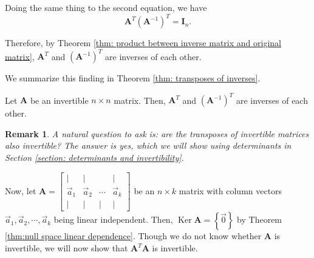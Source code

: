 \documentclass[]{book}
\DeclareMathOperator{\kernel}{Ker}
\newcommand{\inv}[1]{\ensuremath{{#1}^{-1}}}
\newcommand{\invm}[1]{\ensuremath{\inv{\mat{#1}}}}
\newcommand{\mat}[1]{\ensuremath{\mathbf{#1}}}
\newcommand{\idmat}[1][n]{\ensuremath{\mat{I}_#1}}
\newtheorem*{remark}{Remark}
\begin{document}
Doing the same thing to the second equation, we have
\[\mat{A}^T\left(\invm{A}\right)^T = \idmat.\]

Therefore, by Theorem \ref{thm: product between inverse matrix and original matrix}, $\mat{A}^T$ and $\left(\invm{A}\right)^T$ are inverses of each other. 

We summarize this finding in Theorem \ref{thm: transposes of inverses}.

\begin{theorem}
    \label{thm: transposes of inverses}
    Let $\mat{A}$ be an invertible $n \times n$ matrix. Then, $\mat{A}^T$ and $\left(\invm{A}\right)^T$ are inverses of each other.
\end{theorem}

\begin{remark}
    A natural question to ask is: are the transposes of invertible matrices also invertible? The answer is yes, which we will show using determinants in Section \ref{section: determinants and invertibility}.
\end{remark}

Now, let $\mat{A} = \begin{bmatrix}\vert&\vert&&\vert \\ \vec{a}_1 & \vec{a}_2 & \cdots & \vec{a}_k \\ \vert & \vert & \vert & \vert \end{bmatrix}$ be an $n \times k$ matrix with column vectors $\vec{a}_1,\vec{a}_2,\cdots,\vec{a}_k$ being linear independent. Then, $\kernel\mat{A} = \left\{\vec{0}\right\}$ by Theorem \ref{thm:null space linear dependence}. Though we do not know whether $\mat{A}$ is invertible, we will now show that $\mat{A}^T\mat{A}$ is invertible. 
\end{document}
